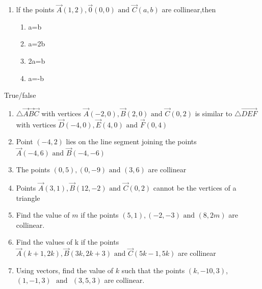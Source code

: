 \begin{enumerate}[label=\thesection.\arabic*,ref=\thesection.\theenumi]
\item lf the points $\vec{A}(1,2),\vec{0}(0,0)\text{ and }\vec{C}(a,b)$ are collinear,then
\begin{enumerate}
\item a=b
\item a=2b
\item 2a=b
\item a=-b
\end{enumerate}
\end{enumerate}
True/false
\begin{enumerate}[label=\thesection.\arabic*,ref=\thesection.\theenumi,resume*]
	\item $\triangle\vec{A}\vec{B}\vec{C}$ with vertices $\vec{A}(-2,0), \vec{B}(2,0) \text{ and }\vec{C}(0,2)$ is similar to $\triangle \vec{DEF}$  with vertices $\vec {D}(-4,0),\vec{E}(4,0)  \text{ and } \vec{F}(0,4)$  
	\item Point $ (-4,2)$ lies on the line segment joining the points $ \vec{A}(-4,6) \text{ and } \vec{B}(-4,-6)$
 \item The points $(0,5),(0,-9)\text{ and }(3,6)$ are collinear
\item Points $\vec{A}(3,1), \vec{B}(12,-2) \text{ and } \vec {C}(0,2)$ cannot be the vertices of a triangle
\item Find the value of $m$ if the points $(5,1),(-2,-3) \text{ and }(8,2m)$ are collinear.
\item Find the values of k if the points $\vec{A}(k+1,2k),\vec{B}(3k,2k+3)\text{ and }\vec{C}(5k-1,5k)$ are collinear
\item Using vectors, find the value of $k$ such that the points $(k,-10,3)$, $(1,-1,3)$ $\text{ and }$ $(3,5,3)$ are collinear.
\end{enumerate}
